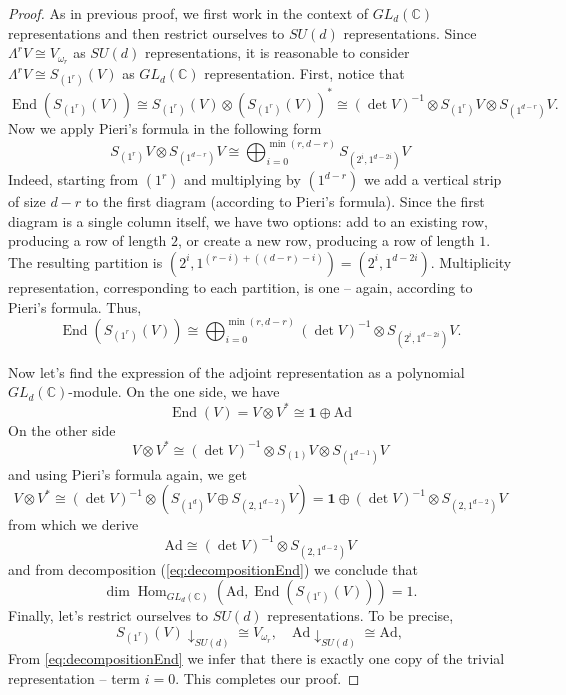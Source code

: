 \documentclass[10pt,twocolumn,superscriptaddress,aps,amsmath,amssymb,citeautoscript,floatfix,prx]{revtex4-2}
\theoremstyle{plain}
\theoremstyle{plain}
\theoremstyle{plain}
\theoremstyle{plain}
\theoremstyle{plain}
\theoremstyle{plain}
\theoremstyle{plain}
\theoremstyle{definition}
\theoremstyle{plain}
\begin{document}
\begin{appendix}
\begin{proof}
As in previous proof, we first work in the context of $GL_d(\mathbb{C})$ representations and then restrict ourselves to $SU(d)$ representations.
Since $\Lambda^r V \cong V_{\omega_r}$ as $SU(d)$ representations, it is reasonable to consider $\Lambda^r V \cong S_{\left(1^r\right)}(V)$ as $GL_d(\mathbb{C})$ representation.
First, notice that
$$
    \operatorname{End}(S_{\left(1^r\right)}(V))\cong S_{\left(1^r\right)}(V) \otimes (S_{\left(1^r\right)}(V))^* \cong (\det V)^{-1} \otimes S_{\left(1^r\right)} V \otimes S_{\left(1^{d-r}\right)} V.
$$
Now we apply Pieri's formula in the following form
\[
S_{\left(1^r\right)} V \otimes S_{\left(1^{d-r}\right)} V \cong \bigoplus_{i=0}^{\min (r, d-r)} S_{\left(2^i, 1^{d-2 i}\right)} V
\]
Indeed, starting from $(1^r)$ and multiplying by $(1^{d-r})$ we add a vertical strip of size $d-r$ to the first diagram (according to Pieri's formula). 
Since the first diagram is a single column itself, we have two options: add to an existing row, producing a row of length $2$, or
create a new row, producing a row of length $1$.
The resulting partition is 
$
\left(2^i, 1^{(r-i)+((d-r)-i)}\right)=\left(2^i, 1^{d-2 i}\right) .
$
Multiplicity representation, corresponding to each partition, is one -- again, according to Pieri's formula.
Thus,
\begin{equation}\label{eq:decompositionEnd}
    \operatorname{End}\left(S_{\left(1^r\right)}(V)\right) \cong \bigoplus_{i=0}^{\min (r, d-r)}(\operatorname{det} V)^{-1} \otimes S_{\left(2^i, 1^{d-2 i}\right)} V.
\end{equation}

Now let's find the expression of the adjoint representation as a polynomial $GL_d(\mathbb{C})$-module. On the one side, we have
\[
    \operatorname{End}(V)=V \otimes V^* \cong \mathbf{1} \oplus \mathrm{Ad}
\]
On the other side
\[
    V \otimes V^* \cong(\operatorname{det} V)^{-1} \otimes S_{\left(1\right)} V \otimes S_{\left(1^{d-1}\right)} V
\]
and using Pieri's formula again, we get
\[
    V \otimes V^* \cong (\operatorname{det} V)^{-1} \otimes \left(S_{\left(1^d\right)} V \oplus S_{\left(2,1^{d-2}\right)} V\right)=\mathbf{1} \oplus(\operatorname{det} V)^{-1} \otimes S_{\left(2,1^{d-2}\right)} V
\]
from which we derive
\[
    \mathrm{Ad} \cong(\operatorname{det} V)^{-1} \otimes S_{\left(2,1^{d-2}\right)} V
\]
and from decomposition (\ref{eq:decompositionEnd}) we conclude that
\[
    \operatorname{dim} \operatorname{Hom}_{GL_d(\mathbb{C})}\left(\mathrm{Ad}, \operatorname{End}\left(S_{\left(1^r\right)}(V)\right)\right)=1 .
\]
Finally, let's restrict ourselves to $SU(d)$ representations. To be precise, 
    \[
        S_{\left(1^r\right)}(V)\downarrow_{SU(d)}\cong V_{\omega_r}, \quad \mathrm{Ad}\downarrow_{SU(d)} \cong \mathrm{Ad},
    \]
From \ref{eq:decompositionEnd} we infer that there is exactly one copy of the trivial representation -- term $i=0$.
This completes our proof.
\end{proof}


\end{appendix}
\end{document}
